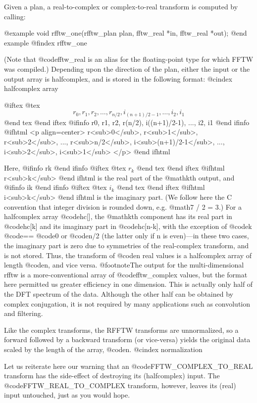 Given a plan, a real-to-complex or complex-to-real transform is computed
by calling:

@example
void rfftw_one(rfftw_plan plan, fftw_real *in, fftw_real *out);
@end example
@findex rfftw_one

(Note that @code{fftw_real} is an alias for the floating-point type for
which FFTW was compiled.)  Depending upon the direction of the plan,
either the input or the output array is halfcomplex, and is stored in
the following format:
@cindex halfcomplex array

@iftex
@tex
$$
r_0, r_1, r_2, \ldots, r_{n/2}, i_{(n+1)/2-1}, \ldots, i_2, i_1
$$
@end tex
@end iftex
@ifinfo
r0, r1, r2, r(n/2), i((n+1)/2-1), ..., i2, i1
@end ifinfo
@ifhtml
<p align=center>
r<sub>0</sub>, r<sub>1</sub>, r<sub>2</sub>, ..., r<sub>n/2</sub>, i<sub>(n+1)/2-1</sub>, ..., i<sub>2</sub>, i<sub>1</sub>
</p>
@end ifhtml

Here,
@ifinfo
rk
@end ifinfo
@iftex
@tex
$r_k$
@end tex
@end iftex
@ifhtml
r<sub>k</sub>
@end ifhtml
is the real part of the @math{k}th output, and
@ifinfo
ik
@end ifinfo
@iftex
@tex
$i_k$
@end tex
@end iftex
@ifhtml
i<sub>k</sub>
@end ifhtml
is the imaginary part.  (We follow here the C convention that integer
division is rounded down, e.g. @math{7 / 2 = 3}.) For a halfcomplex
array @code{hc[]}, the @math{k}th component has its real part in
@code{hc[k]} and its imaginary part in @code{hc[n-k]}, with the
exception of @code{k} @code{==} @code{0} or @code{n/2} (the latter only
if n is even)---in these two cases, the imaginary part is zero due to
symmetries of the real-complex transform, and is not stored.  Thus, the
transform of @code{n} real values is a halfcomplex array of length
@code{n}, and vice versa.  @footnote{The output for the
multi-dimensional rfftw is a more-conventional array of
@code{fftw_complex} values, but the format here permitted us greater
efficiency in one dimension.}  This is actually only half of the DFT
spectrum of the data.  Although the other half can be obtained by
complex conjugation, it is not required by many applications such as
convolution and filtering.

Like the complex transforms, the RFFTW transforms are unnormalized, so a
forward followed by a backward transform (or vice-versa) yields the
original data scaled by the length of the array, @code{n}.
@cindex normalization

Let us reiterate here our warning that an @code{FFTW_COMPLEX_TO_REAL}
transform has the side-effect of destroying its (halfcomplex) input.
The @code{FFTW_REAL_TO_COMPLEX} transform, however, leaves its (real)
input untouched, just as you would hope.

